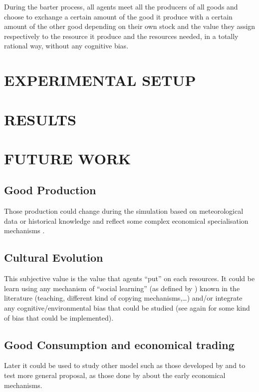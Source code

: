 \documentclass{wscpaperproc}
\begin{document}
During the barter process, all agents meet all the producers of all goods and choose to exchange a certain amount of the good it produce with a certain amount of the other good depending on their own stock and the value they assign respectively to the resource it produce and the resources needed, in a totally rational way, without any cognitive bias.

\section{EXPERIMENTAL SETUP}

\section{RESULTS}

\section{FUTURE WORK}
\subsection{Good Production}
Those production could change during the simulation based on meteorological data or historical knowledge and reflect some complex economical specialisation mechanisms \cite{bentley_specialisation_2005}.


\subsection{Cultural Evolution}
This subjective value is the value that agents ``put'' on each resources. It could be learn using any mechanism of ``social learning'' (as defined by \cite{lycett_cultural_2015}) known in the literature (teaching, different kind of copying mechanisms,\ldots) and/or integrate any cognitive/environmental bias that could be studied (see again \cite{lycett_cultural_2015} for some kind of bias that could be implemented).


\subsection{Good Consumption and economical trading}
Later it could be used to study other model such as those developed by 
\cite{rubinstein_equilibrium_1985} and to test more general proposal, as those done by \cite{polanyi_trade_1957,polanyi_livelihood_1977} about the early economical mechanisms.
\end{document}
